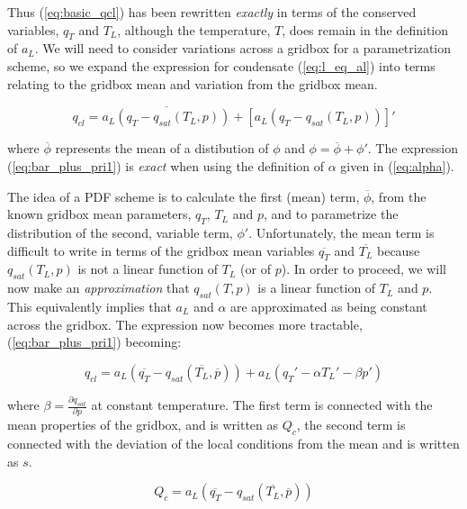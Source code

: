 \documentclass{UMDP_article}
\begin{document}
Thus (\ref{eq:basic_qcl}) has been rewritten \textit{exactly} in terms of the conserved
variables, $q_T$ and $T_L$, although the temperature, $T$, does remain in the
definition of $a_L$.
We will need to consider variations across a gridbox for a
parametrization scheme,
so we expand the expression for condensate (\ref{eq:l_eq_al}) into terms
relating to the gridbox mean and variation from the gridbox mean.

\begin{equation}
q_{cl} = \overline{ a_L \left( q_T - q_{sat}(T_L,p) \right)}
+ [ a_L \left( q_T - q_{sat}(T_L,p) \right) ]'
\label{eq:bar_plus_pri1}
\end{equation}

where $\overline{\phi}$ represents the mean of a distibution of $\phi$ and
$\phi = \overline{\phi} + {\phi}'$. The expression (\ref{eq:bar_plus_pri1})
is \textit{exact} when
using the definition of $\alpha$ given in (\ref{eq:alpha}).

The idea of a PDF scheme is to calculate the first (mean) term,
$\overline{\phi}$, from the known gridbox mean parameters, $q_T$, $T_L$
and $p$, and to parametrize the distribution of the second,
variable term, ${\phi}'$. Unfortunately, the mean term is difficult
to write in terms of the gridbox mean variables $\overline{q_T}$
and $\overline{T_L}$ because
$q_{sat}(T_L,p)$ is not a linear function of $T_L$ (or of $p$). In order to
proceed, we will now make an \textit{approximation} that $q_{sat}(T,p)$
is a linear function of $T_L$ and $p$.
This equivalently implies that $a_L$ and $\alpha$ are approximated as
being constant across the gridbox. The expression
now becomes more tractable, (\ref{eq:bar_plus_pri1}) becoming:

\begin{equation}
q_{cl} = a_L \left( \overline{q_T} - q_{sat}(\overline{T_L},\overline{p})
\right)  + a_L \left(  {q_T}' - \alpha {T_L}' - \beta {p}' \right)
\label{eq:l_eq_bar_plus_pri}
\end{equation}

where $\beta = {\frac{\partial q_{sat}}{\partial p}}$ at constant
temperature.  The first term is connected with the mean properties of
the gridbox, and is written as $Q_c$, the second term is connected with the
deviation of the local conditions from the mean and is written as
$s$.

\begin{equation}
Q_c = a_L \left( \overline{q_T} - q_{sat}(\overline{T_L},\overline{p}) \right)
\label{eq:qc_eq_qt-qs}
\end{equation}
\end{document}
